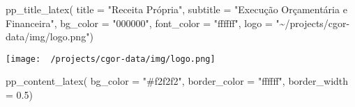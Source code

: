 \documentclass[
]{article}
\author{}
\date{\vspace{-2.5em}}
\newenvironment{Shaded}{\begin{snugshade}}{\end{snugshade}}
\newcommand{\AttributeTok}[1]{\textcolor[rgb]{0.77,0.63,0.00}{#1}}
\newcommand{\FloatTok}[1]{\textcolor[rgb]{0.00,0.00,0.81}{#1}}
\newcommand{\FunctionTok}[1]{\textcolor[rgb]{0.00,0.00,0.00}{#1}}
\newcommand{\NormalTok}[1]{#1}
\newcommand{\StringTok}[1]{\textcolor[rgb]{0.31,0.60,0.02}{#1}}
\begin{document}
\begin{Shaded}
\begin{Highlighting}[]
\FunctionTok{pp\_title\_latex}\NormalTok{(}
  \AttributeTok{title =} \StringTok{"Receita Própria"}\NormalTok{,}
  \AttributeTok{subtitle =} \StringTok{"Execução Orçamentária e Financeira"}\NormalTok{,}
  \AttributeTok{bg\_color =} \StringTok{"000000"}\NormalTok{,}
  \AttributeTok{font\_color =} \StringTok{"ffffff"}\NormalTok{,}
  \AttributeTok{logo =} \StringTok{"\textasciitilde{}/projects/cgor{-}data/img/logo.png"}\NormalTok{)}
\end{Highlighting}
\end{Shaded}

       \begin{tcolorbox}[arc=0mm,colback=bgcolor,boxsep=3mm,colframe=bgcolor,colframe=white,sidebyside,righthand width=5cm]
        
        \color{gray!20}{\rule{\linewidth}{0.2mm}}
        
        
        \tcblower
        \texttt{[image: ~/projects/cgor-data/img/logo.png]}
       \end{tcolorbox}
       \color{black}

\begin{Shaded}
\begin{Highlighting}[]
\FunctionTok{pp\_content\_latex}\NormalTok{(}
  \AttributeTok{bg\_color =} \StringTok{"\#f2f2f2"}\NormalTok{,}
  \AttributeTok{border\_color =} \StringTok{"ffffff"}\NormalTok{, }
  \AttributeTok{border\_width =} \FloatTok{0.5}\NormalTok{)}
\end{Highlighting}
\end{Shaded}

       \color{colline}{\rule{\linewidth}{0.5mm}}
       \begin{tcolorbox}[arc=0mm,colback=colback,colframe=white]
          
          \tableofcontents
      
          \end{tcolorbox}
       \color{colline}{\rule{\linewidth}{0.5mm}}
       \color{black}
\end{document}
